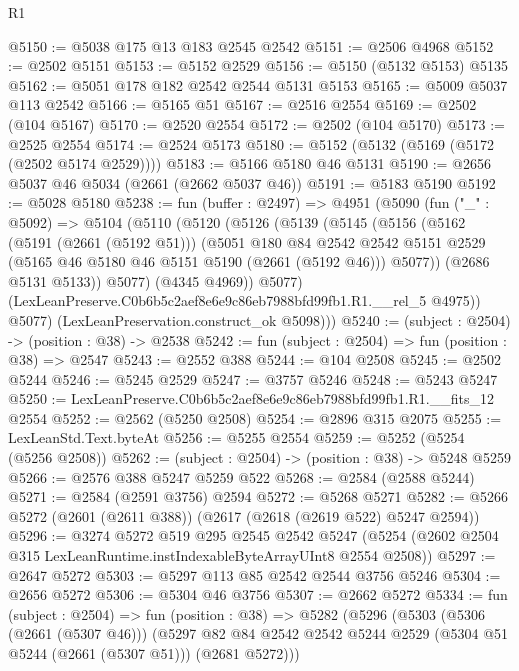 \begin{lexlean}{R1}
\begin{coremodule}
@5150 := @5038 @175 @13 @183 @2545 @2542
@5151 := @2506 @4968
@5152 := @2502 @5151
@5153 := @5152 @2529
@5156 := @5150 (@5132 @5153) @5135
@5162 := @5051 @178 @182 @2542 @2544 @5131 @5153
@5165 := @5009 @5037 @113 @2542
@5166 := @5165 @51
@5167 := @2516 @2554
@5169 := @2502 (@104 @5167)
@5170 := @2520 @2554
@5172 := @2502 (@104 @5170)
@5173 := @2525 @2554
@5174 := @2524 @5173
@5180 := @5152 (@5132 (@5169 (@5172 (@2502 @5174 @2529))))
@5183 := @5166 @5180 @46 @5131
@5190 := @2656 @5037 @46 @5034 (@2661 (@2662 @5037 @46))
@5191 := @5183 @5190
@5192 := @5028 @5180
@5238 := fun (buffer : @2497) =>
  @4951
    (@5090
      (fun ("_" : @5092) =>
      @5104
        (@5110
          (@5120
            (@5126
              (@5139
                (@5145
                  (@5156
                    (@5162
                      (@5191 (@2661 (@5192 @51)))
                      (@5051
                        @180
                        @84
                        @2542
                        @2542
                        @5151
                        @2529
                        (@5165 @46 @5180 @46 @5151 @5190 (@2661 (@5192 @46)))
                        @5077))
                    (@2686 @5131 @5133))
                  @5077)
                (@4345 @4969))
              @5077)
            (LexLeanPreserve.C0b6b5c2aef8e6e9c86eb7988bfd99fb1.R1.__rel_5 @4975))
          @5077)
        (LexLeanPreservation.construct_ok @5098)))
@5240 := (subject : @2504) -> (position : @38) -> @2538
@5242 := fun (subject : @2504) => fun (position : @38) => @2547
@5243 := @2552 @388
@5244 := @104 @2508
@5245 := @2502 @5244
@5246 := @5245 @2529
@5247 := @3757 @5246
@5248 := @5243 @5247
@5250 := LexLeanPreserve.C0b6b5c2aef8e6e9c86eb7988bfd99fb1.R1.__fits_12 @2554
@5252 := @2562 (@5250 @2508)
@5254 := @2896 @315 @2075
@5255 := LexLeanStd.Text.byteAt
@5256 := @5255 @2554
@5259 := @5252 (@5254 (@5256 @2508))
@5262 := (subject : @2504) -> (position : @38) -> @5248 @5259
@5266 := @2576 @388 @5247 @5259 @522
@5268 := @2584 (@2588 @5244)
@5271 := @2584 (@2591 @3756) @2594
@5272 := @5268 @5271
@5282 := @5266 @5272 (@2601 (@2611 @388)) (@2617 (@2618 (@2619 @522) @5247 @2594))
@5296 := @3274
    @5272
    @519
    @295
    @2545
    @2542
    @5247
    (@5254 (@2602 @2504 @315 LexLeanRuntime.instIndexableByteArrayUInt8 @2554 @2508))
@5297 := @2647 @5272
@5303 := @5297 @113 @85 @2542 @2544 @3756 @5246
@5304 := @2656 @5272
@5306 := @5304 @46 @3756
@5307 := @2662 @5272
@5334 := fun (subject : @2504) =>
  fun (position : @38) =>
  @5282
    (@5296
      (@5303
        (@5306 (@2661 (@5307 @46)))
        (@5297 @82 @84 @2542 @2542 @5244 @2529 (@5304 @51 @5244 (@2661 (@5307 @51))) (@2681 @5272)))

\end{coremodule}
\end{lexlean}
